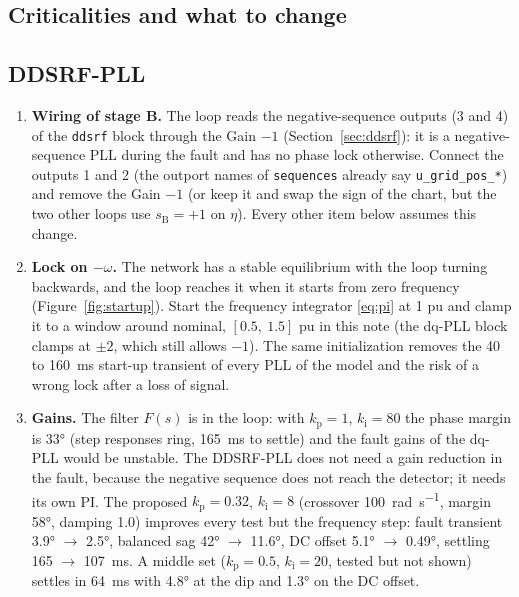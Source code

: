 \documentclass[11pt,a4paper]{scrartcl}
\newcommand{\ped}[1]{_{\mathrm{#1}}}
\newcommand{\code}[1]{\texttt{#1}}
\begin{document}
\begin{onehalfspace}
\section{Criticalities and what to change}
\label{sec:crit}

\subsection{DDSRF-PLL}
\label{sec:critddsrf}

\begin{enumerate}
	\item \textbf{Wiring of stage B.} The loop reads the negative-sequence outputs (3 and 4) of the \code{ddsrf} block through the Gain $-1$ (Section~\ref{sec:ddsrf}): it is a negative-sequence PLL during the fault and has no phase lock otherwise. Connect the outputs 1 and 2 (the outport names of \code{sequences} already say \code{u\_grid\_pos\_*}) and remove the Gain $-1$ (or keep it and swap the sign of the chart, but the two other loops use $s\ped{B} = +1$ on $\eta$). Every other item below assumes this change.
	\item \textbf{Lock on $-\omega$.} The network has a stable equilibrium with the loop turning backwards, and the loop reaches it when it starts from zero frequency (Figure~\ref{fig:startup}). Start the frequency integrator \eqref{eq:pi} at \num{1} pu and clamp it to a window around nominal, $[0.5,\ 1.5]$ pu in this note (the dq-PLL block clamps at $\pm 2$, which still allows $-1$). The same initialization removes the \SI{40}{} to \SI{160}{\milli\second} start-up transient of every PLL of the model and the risk of a wrong lock after a loss of signal.
	\item \textbf{Gains.} The filter $F(s)$ is in the loop: with $k\ped{p} = 1$, $k\ped{i} = 80$ the phase margin is \ang{33} (step responses ring, \SI{165}{\milli\second} to settle) and the fault gains of the dq-PLL would be unstable. The DDSRF-PLL does not need a gain reduction in the fault, because the negative sequence does not reach the detector; it needs its own PI. The proposed $k\ped{p} = 0.32$, $k\ped{i} = 8$ (crossover \SI{100}{\radian\per\second}, margin \ang{58}, damping \num{1.0}) improves every test but the frequency step: fault transient \ang{3.9} $\to$ \ang{2.5}, balanced sag \ang{42} $\to$ \ang{11.6}, DC offset \ang{5.1} $\to$ \ang{0.49}, settling \SI{165}{} $\to$ \SI{107}{\milli\second}. A middle set ($k\ped{p} = 0.5$, $k\ped{i} = 20$, tested but not shown) settles in \SI{64}{\milli\second} with \ang{4.8} at the dip and \ang{1.3} on the DC offset.

\end{enumerate}
\end{onehalfspace}
\end{document}
